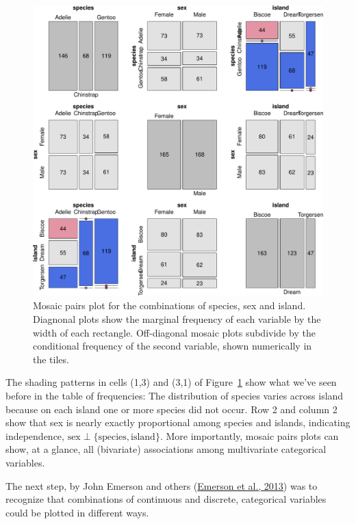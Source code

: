 \documentclass[
  letterpaper,
  10pt,
  krantz2]{krantz}
\begin{document}
\begin{figure}[H]

{\centering \includegraphics[width=1\textwidth,height=\textheight]{figs/ch03/fig-peng-mosaic-1.pdf}

}

\caption{\label{fig-peng-mosaic}Mosaic pairs plot for the combinations
of species, sex and island. Diagnonal plots show the marginal frequency
of each variable by the width of each rectangle. Off-diagonal mosaic
plots subdivide by the conditional frequency of the second variable,
shown numerically in the tiles.}

\end{figure}

The shading patterns in cells (1,3) and (3,1) of
Figure~\ref{fig-peng-mosaic} show what we've seen before in the table of
frequencies: The distribution of species varies across island because on
each island one or more species did not occur. Row 2 and column 2 show
that sex is nearly exactly proportional among species and islands,
indicating independence,
\(\text{sex} \perp \{\text{species}, \text{island}\}\). More
importantly, mosaic pairs plots can show, at a glance, all (bivariate)
associations among multivariate categorical variables.

The next step, by John Emerson and others
(\protect\hyperlink{ref-Emerson-etal:2013}{Emerson et al., 2013}) was to
recognize that combinations of continuous and discrete, categorical
variables could be plotted in different ways.
\end{document}
